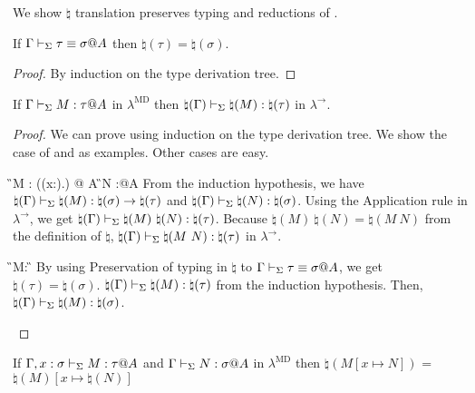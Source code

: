 We show \( \natural \) translation preserves typing and reductions of \LMD.

\begin{lemma}
    If $\Gamma \vdash_\Sigma \tau \equiv \sigma @ A$ then $\natural(\tau) = \natural(\sigma)$.
\end{lemma}

\begin{proof}
    By induction on the type derivation tree.
\end{proof}

\begin{lemma}
    \label{lemma:PreservationOfTypingInNatural}
    If $\G \V M:\tau@A$ in $\lambda^{\text{MD}}$ then $\natural(\Gamma) \vdash_\Sigma \natural(M): \natural(\tau)$ in $\lambda^\to$.
\end{lemma}

\begin{proof}
    We can prove using induction on the type derivation tree.
    We show the case of \TApp{} and \TConv{} as examples.
    Other cases are easy.
    \begin{rneqncase}{\TApp{}}{
            \G \V M : (\Pi(x:\sigma).\tau) @ A  \G \V N :\sigma @A
        }
        From the induction hypothesis, we have $\natural(\Gamma) \vdash_\Sigma \natural(M) : \natural(\sigma) \to \natural(\tau)$ and $\natural(\Gamma) \vdash_\Sigma \natural(N) : \natural(\sigma)$.
        Using the Application rule in $\lambda^\to$, we get $\natural(\G) \V \natural(M)\ \natural(N) : \natural(\tau)$.
        Because $\natural(M)\ \natural(N) = \natural(M\ N)$ from the definition of $\natural$, $\natural(\Gamma) \vdash_\Sigma \natural(M\ N) : \natural(\tau)$ in $\lambda^\to$.
    \end{rneqncase}
    \begin{rneqncase}{\TConv{}}{
            \G\V M:\tau@A {} \G\V \tau\E\sigma@A
        }
        By using Preservation of typing in $\natural$ to $\G\V \tau\E\sigma@A$, we get $\natural(\tau) = \natural(\sigma)$.
        $\natural(\Gamma) \vdash_\Sigma \natural(M):\natural(\tau)$ from the induction hypothesis.
        Then, $\natural(\Gamma) \vdash_\Sigma \natural(M):\natural(\sigma)$.
    \end{rneqncase}
\end{proof}

\begin{lemma}
    If $\G, x:\sigma \V M:\tau@A$ and $\G \V N:\sigma@A$ in $\lambda^{\text{MD}}$
    then $\natural(M[x \mapsto N])$ = $\natural(M)[x\mapsto\natural(N)]$
\end{lemma}

